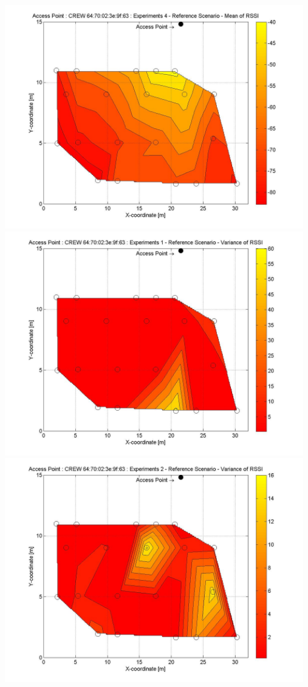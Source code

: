 \documentclass[11pt,a4paper,headinclude,footinclude,chapterprefix=on]{scrreprt}
\begin{document}
\begin{longtable}
	\includegraphics[width=13cm]{../../Source/plot/CREW_63/63_Ref_Ex_4_Mean.jpg} \\
	\includegraphics[width=13cm]{../../Source/plot/CREW_63/63_Ref_Ex_1_Variance.jpg} \\
	\includegraphics[width=13cm]{../../Source/plot/CREW_63/63_Ref_Ex_2_Variance.jpg} \\

\end{longtable}
\end{document}
